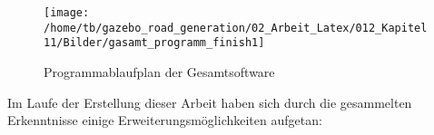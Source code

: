 \newpage

\begin{figure}[H]
\begin{center}
  \texttt{[image: /home/tb/gazebo\_road\_generation/02\_Arbeit\_Latex/012\_Kapitel11/Bilder/gasamt\_programm\_finish1]}%
  \caption[Programmablaufplan der Gesamtsoftware]%
           {\label{fig:gs}%
           Programmablaufplan der Gesamtsoftware}
\end{center}
\end{figure}

\newpage


Im Laufe der Erstellung dieser Arbeit haben sich durch die gesammelten Erkenntnisse einige
Erweiterungsm\"oglichkeiten aufgetan:



